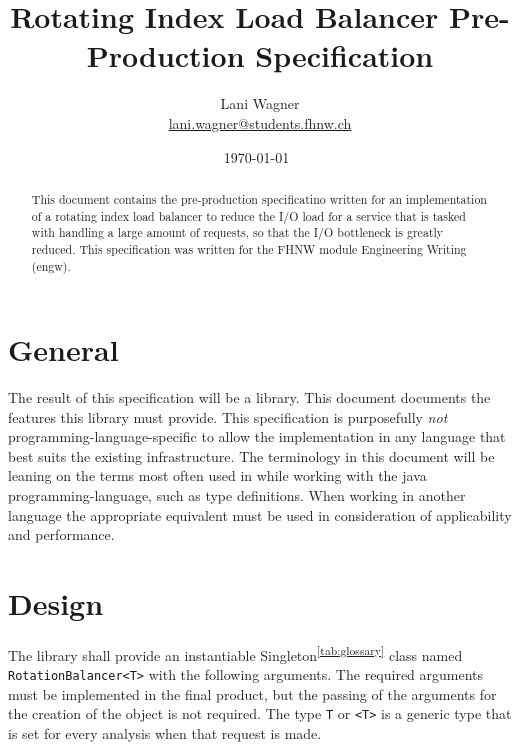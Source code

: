 \documentclass[11pt]{article} %
\title{Rotating Index Load Balancer Pre-Production Specification}
\author{Lani Wagner\\\href{mailto:lani.wagner@students.fhnw.ch}{lani.wagner@students.fhnw.ch}}
\date{\today\ \currenttime} %
\begin{document}
    \clearpage\maketitle
    \thispagestyle{empty}
    \begin{abstract}
        This document contains the pre-production specificatino written for an implementation of a rotating index
        load balancer to reduce the I/O load for a service that is tasked with handling a large amount of requests,
        so that the I/O bottleneck is greatly reduced. This specification was written for the FHNW module Engineering
        Writing (engw).
    \end{abstract}
    {\hypersetup{hidelinks} \tableofcontents}
    \newpage



    \section{General}

    The result of this specification will be a library. This document documents the features this library must
    provide. This specification is purposefully \textit{not} programming-language-specific to allow the
    implementation in any language that best suits the existing infrastructure. The terminology in this document
    will be leaning on the terms most often used in while working with the java programming-language, such as
    type definitions. When working in another language the appropriate equivalent must be used in consideration
    of applicability and performance.



    \section{Design}

    The library shall provide an instantiable Singleton\textsuperscript{\ref{tab:glossary}} class named
    \verb|RotationBalancer<T>| with the following arguments. The required arguments must be implemented in the final
    product, but the passing of the arguments for the creation of the object is not required. The type \verb|T| or
    \verb|<T>| is a generic type that is set for every analysis when that request is made.
\end{document}
